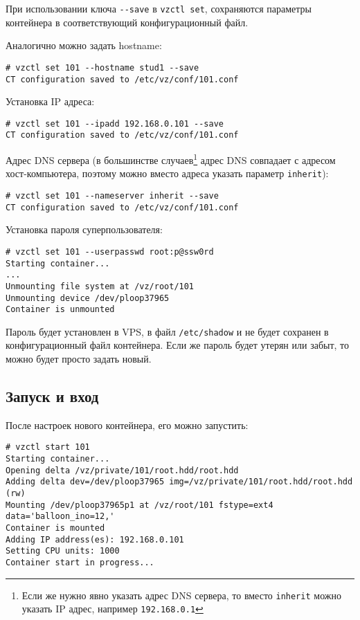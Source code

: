 При использовании ключа \texttt{-{}-save} в \texttt{vzctl set}, сохраняются параметры контейнера в соответствующий конфигурационный файл.

Аналогично можно задать hostname:
\begin{lstlisting}
# vzctl set 101 --hostname stud1 --save
CT configuration saved to /etc/vz/conf/101.conf
\end{lstlisting}

Установка IP адреса:
\begin{lstlisting}
# vzctl set 101 --ipadd 192.168.0.101 --save
CT configuration saved to /etc/vz/conf/101.conf
\end{lstlisting}

Адрес DNS сервера (в большинстве случаев\footnote{Если же нужно явно указать адрес DNS сервера, то вместо \texttt{inherit} можно указать IP адрес, например \texttt{192.168.0.1}} адрес DNS совпадает с адресом хост-компьютера, поэтому можно вместо адреса указать параметр \texttt{inherit}):
\begin{lstlisting}
# vzctl set 101 --nameserver inherit --save
CT configuration saved to /etc/vz/conf/101.conf
\end{lstlisting}

Установка пароля суперпользователя:
\begin{lstlisting}
# vzctl set 101 --userpasswd root:p@ssw0rd
Starting container...
...
Unmounting file system at /vz/root/101
Unmounting device /dev/ploop37965
Container is unmounted
\end{lstlisting}

Пароль будет установлен в VPS, в файл \texttt{/etc/shadow} и не будет сохранен в конфигурационный файл контейнера.
Если же пароль будет утерян или забыт, то можно будет просто задать новый.

\subsection{Запуск и вход}
После настроек нового контейнера, его можно запустить:
\begin{lstlisting}
# vzctl start 101
Starting container...
Opening delta /vz/private/101/root.hdd/root.hdd
Adding delta dev=/dev/ploop37965 img=/vz/private/101/root.hdd/root.hdd (rw)
Mounting /dev/ploop37965p1 at /vz/root/101 fstype=ext4 data='balloon_ino=12,' 
Container is mounted
Adding IP address(es): 192.168.0.101
Setting CPU units: 1000
Container start in progress...
\end{lstlisting}

